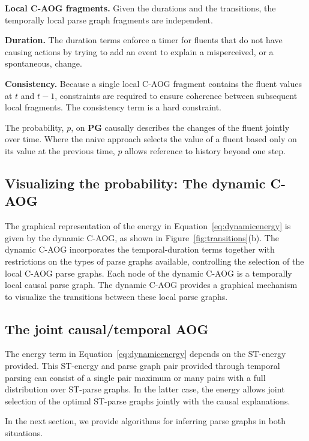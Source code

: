 \documentclass[10pt,journal,letterpaper,compsoc]{IEEEtran}
\begin{document}
\textbf{Local C-AOG fragments.}  Given the durations and the transitions, the temporally local parse graph fragments are independent. 

\textbf{Duration.}  The duration terms enforce a timer for fluents that do not have causing actions by trying to add an event to explain a misperceived, or a spontaneous, change. 

\textbf{Consistency.}  Because a single local C-AOG fragment contains the fluent values at $t$ and $t-1$, constraints are required to ensure coherence between subsequent local fragments.  The consistency term is a hard constraint. 

The probability, $p$, on $\mathbf{PG}$ causally describes the changes of the fluent jointly over time.  Where the naive approach selects the value of a fluent based only on its value at the previous time, $p$ allows reference to history beyond one step.



\subsection{Visualizing the probability: The dynamic C-AOG}

The graphical representation of the energy in Equation~\ref{eq:dynamicenergy} is given by the dynamic C-AOG, as shown in Figure~\ref{fig:transitions}(b).  The dynamic C-AOG incorporates the temporal-duration terms together with restrictions on the types of parse graphs available, controlling the selection of the local C-AOG parse graphs.   Each node of the dynamic C-AOG is a temporally local causal parse graph.  The dynamic C-AOG provides a graphical mechanism to visualize the transitions between these local parse graphs.



\subsection{The joint causal/temporal AOG}

The energy term in Equation~\ref{eq:dynamicenergy} depends on the ST-energy provided.  This ST-energy and parse graph pair provided through temporal parsing can consist of a single pair maximum or many pairs with a full distribution over ST-parse graphs.  In the latter case, the energy allows joint selection of the optimal ST-parse graphs jointly with the causal explanations.  

In the next section, we provide algorithms for inferring parse graphs in both situations.
\end{document}
